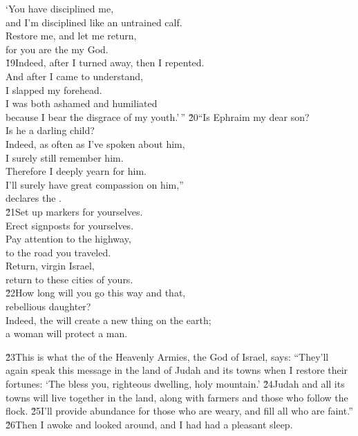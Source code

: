 \begin{poetry}
\poeml `You have disciplined me, \\
\poemll    and I'm disciplined like an untrained calf. \\
\poeml Restore me, and let me return, \\
\poemll    for you are the  my God. \\
\poeml \v{19}Indeed, after I turned away, then I repented. \\
\poemll    And after I came to understand, \\
\poemlll       I slapped my forehead. \\
\poeml I was both ashamed and humiliated \\
\poemll    because I bear the disgrace of my youth.'\,''
\poeml \v{20}``Is Ephraim my dear son? \\
\poemll    Is he a darling child? \\
\poeml Indeed, as often as I've spoken about him, \\
\poemll    I surely still remember him. \\
\poeml Therefore I deeply yearn for him. \\
\poemll    I'll surely have great compassion on him,'' \\
\poemlll       declares the . \\
\poeml \v{21}Set up markers for yourselves. \\
\poemll    Erect signposts for yourselves. \\
\poeml Pay attention to the highway, \\
\poemll    to the road you traveled. \\
\poeml Return, virgin Israel, \\
\poemll    return to these cities of yours. \\
\poeml \v{22}How long will you go this way and that, \\
\poemll    rebellious daughter? \\
\poeml Indeed, the  will create a new thing on the earth; \\
\poemll    a woman will protect a man.
\end{poetry}

\v{23}This is what the  of the Heavenly Armies, the God of Israel, says: ``They'll again speak this message in the land of Judah and its towns when I restore their fortunes: `The  bless you, righteous dwelling, holy mountain.' \v{24}Judah and all its towns will live together in the land, along with farmers and those who follow the flock. \v{25}I'll provide abundance for those who are weary, and fill all who are faint.'' \v{26}Then I awoke and looked around, and I had had a pleasant sleep.

